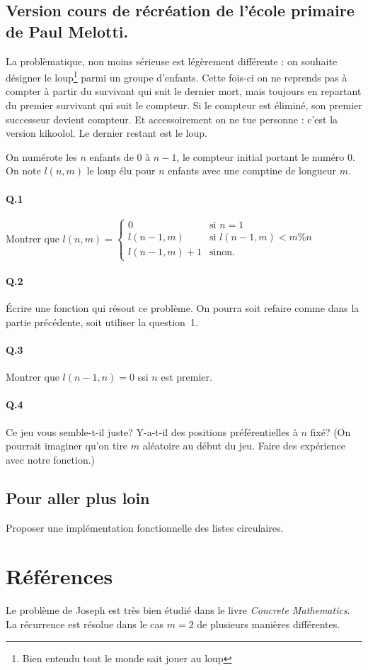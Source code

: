 \documentclass[10pt,a4paper]{article}
\begin{document}
\subsection{Version cours de récréation de l'école primaire de Paul Melotti.}
La problèmatique, non moins sérieuse est légèrement différente : on souhaite désigner le loup\footnote{Bien entendu tout le monde sait jouer au loup} parmi un groupe d'enfants.
Cette fois-ci on ne reprends pas à compter à partir du survivant qui suit le dernier mort, mais toujours en repartant du premier survivant qui suit le compteur. Si le compteur est éliminé, son premier successeur devient compteur.
Et accessoirement on ne tue personne : c'est la version kikoolol. Le dernier restant est le loup.

On numérote les $n$ enfants de $0$ à $n-1$, le compteur initial portant le numéro $0$. On note $l(n,m)$ le loup élu pour $n$ enfants avec une comptine de longueur $m$.

\paragraph{Q.1} Montrer que $l(n,m) = \left\{
	\begin{array}{ll}
		0  & \mbox{si } n = 1 \\
		l(n-1,m) & \mbox{si } l(n-1,m) < m \% n \\
		l(n-1,m) + 1 & \mbox{sinon}.
	\end{array}
\right. $
\paragraph{Q.2} Écrire une fonction qui résout ce problème. On pourra soit refaire comme dans la partie précédente, soit utiliser la question 1.
\paragraph{Q.3} Montrer que $l(n-1,n) = 0$ ssi $n$ est premier.
\paragraph{Q.4} Ce jeu vous semble-t-il juste? Y-a-t-il des positions préférentielles à $n$ fixé? (On pourrait imaginer qu'on tire $m$ aléatoire au début du jeu. Faire des expérience avec notre fonction.)
\subsection{Pour aller plus loin}
Proposer une implémentation fonctionnelle des listes circulaires.
\section{Références}
Le problème de Joseph est très bien étudié dans le livre \emph{Concrete Mathematics}. La récurrence est résolue dans le cas $m=2$ de plusieurs manières différentes.
\end{document}
